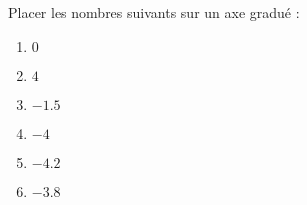 
\begin{exercice}\label{exo2smath-0197}

    Placer les nombres suivants sur un axe gradué :
    \begin{multicols}{3}
        \begin{enumerate}
            \item
                \( 0\)
            \item
                \( 4\)
            \item
                \( -1.5\)
            \item
                \( -4\)
            \item
                \( -4.2\)
            \item
                \( -3.8\)
        \end{enumerate}
    \end{multicols}

\end{exercice}
